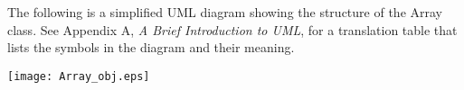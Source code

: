
\pagebreak


The following is a simplified UML diagram showing the structure of the
Array class.  See Appendix A, {\it A Brief Introduction to UML},
for a translation table that lists the symbols in the diagram and their 
meaning.

\begin{center}
\texttt{[image: Array\_obj.eps]}   
\end{center}
